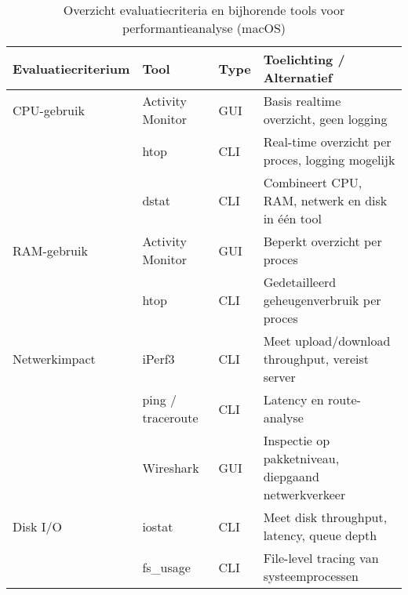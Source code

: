 \begin{table}[h]
    \centering
    \small
    \scriptsize
    \begin{tabular}{
        >{\raggedright\arraybackslash}p{3.5cm} 
        >{\raggedright\arraybackslash}p{4cm} 
        >{\raggedright\arraybackslash}p{2.5cm} 
        >{\raggedright\arraybackslash}p{4cm}
    }
        \toprule
        \textbf{Evaluatiecriterium} & \textbf{Tool} & \textbf{Type} & \textbf{Toelichting / Alternatief} \\ 
        \midrule
        CPU-gebruik & Activity Monitor & GUI & Basis realtime overzicht, geen logging \\
                    & htop & CLI & Real-time overzicht per proces, logging mogelijk \\
                    & dstat & CLI & Combineert CPU, RAM, netwerk en disk in één tool \\
        \midrule
        RAM-gebruik & Activity Monitor & GUI & Beperkt overzicht per proces \\
                    & htop & CLI & Gedetailleerd geheugenverbruik per proces \\
        \midrule
        Netwerkimpact & iPerf3 & CLI & Meet upload/download throughput, vereist server \\
                      & ping / traceroute & CLI & Latency en route-analyse \\
                      & Wireshark & GUI & Inspectie op pakketniveau, diepgaand netwerkverkeer \\
        \midrule
        Disk I/O & iostat & CLI & Meet disk throughput, latency, queue depth \\
                 & fs\_usage & CLI & File-level tracing van systeemprocessen \\
        \bottomrule
    \end{tabular}
    \caption{Overzicht evaluatiecriteria en bijhorende tools voor performantieanalyse (macOS)}
    \label{tab:eval-criteria-performance}
\end{table}
